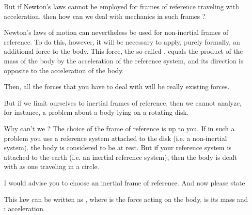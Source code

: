 \begin{s}
But if Newton's laws cannot be employed for frames of reference traveling with acceleration, then how can we deal with mechanics in such frames ?
\end{s}


\begin{p}
Newton's laws of motion can nevertheless be used for non-inertial frames of reference. To do this, however, it will be necessary to apply, purely formally, an additional force to the body. This force, the so called , equals the product of the mass of the body by the acceleration of the reference system, and its direction is opposite to the acceleration of the body. 

 Then, all the forces that you have to deal with will be really existing forces.
\end{p}


\begin{s}
But if we limit ourselves to inertial frames of reference, then we cannot analyze, for instance, a problem about a body lying on a rotating disk.
\end{s}


\begin{p}
Why can't we ? The choice of the frame of reference is up to you. If in such a problem you use a reference system attached to the disk (i.e. a non-inertial system), the body is considered to be at rest. But if your reference system is attached to the earth (i.e. an inertial reference system), then the body is dealt with as one traveling in a circle.

I would advise you to choose an inertial frame of reference. And now please state 
\end{p}



\begin{s}
This law can be written as , where  is the force acting on the body,  is its mass and  : acceleration.
\end{s}


